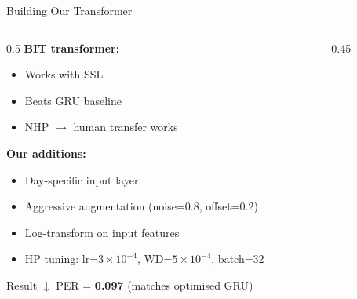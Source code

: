 \documentclass[aspectratio=169]{beamer}
\begin{document}
\begin{frame}{Building Our Transformer}
  \begin{columns}
    \begin{column}{0.5\textwidth}
      \textbf{BIT transformer:}
      \begin{itemize}
        \item Works with SSL
        \item Beats GRU baseline
        \item NHP $\to$ human transfer works
      \end{itemize}
      \vspace{0.5em}
      \textbf{Our additions:}
      \begin{itemize}
        \item Day-specific input layer
        \item Aggressive augmentation (noise=0.8, offset=0.2)
        \item Log-transform on input features
        \item HP tuning: lr=$3\times10^{-4}$, WD=$5\times10^{-4}$, batch=32
      \end{itemize}
      \vspace{0.4em}
      \begin{block}{Result}
        \centering $\downarrow$ PER = \textbf{0.097} (matches optimised GRU)
      \end{block}
    \end{column}
    \begin{column}{0.45\textwidth}
      \begin{center}
      \end{center}
    \end{column}
  \end{columns}
\end{frame}
\end{document}

